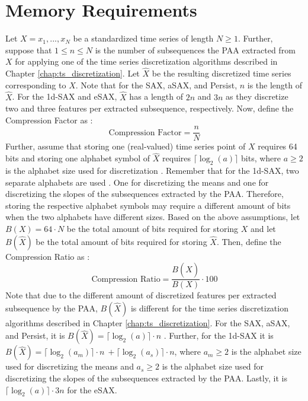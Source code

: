 \section{Memory Requirements}
Let $X = x_1, ..., x_N$ be a standardized time series of length $N \geq 1$. Further, suppose that $1 \leq n \leq N$ is the number of subsequences the \ac{PAA} extracted from $X$ for applying one of the time series discretization algorithms described in Chapter \ref{chap:ts_discretization}. Let $\hat{X}$ be the resulting discretized time series corresponding to $X$. Note that for the \ac{SAX}, \ac{aSAX}, and Persist, $n$ is the length of $\hat{X}$. For the \ac{1d-SAX} and \ac{eSAX}, $\hat{X}$ has a length of $2n$ and $3n$ as they discretize two and three features per extracted subsequence, respectively. Now, define the Compression Factor as \cite{Comparison_SAX}:
\begin{equation}
\text{Compression Factor} = \frac{n}{N}
\label{eq:compression_factor}
\end{equation}
Further, assume that storing one (real-valued) time series point of $X$ requires 64 bits and storing one alphabet symbol of $\hat{X}$ requires $\lceil \log_{2}(a) \rceil$ bits, where $a \geq 2$ is the alphabet size used for discretization \cite{Comparison_SAX}. \newline
Remember that for the \ac{1d-SAX}, two separate alphabets are used \cite{1d-SAX}. One for discretizing the means and one for discretizing the slopes of the subsequences extracted by the \ac{PAA}. Therefore, storing the respective alphabet symbols may require a different amount of bits when the two alphabets have different sizes. \newline
Based on the above assumptions, let $B(X) = 64 \cdot N$ be the total amount of bits required for storing $X$ and let $B(\hat{X})$ be the total amount of bits required for storing $\hat{X}$. Then, define the Compression Ratio as \cite{Comparison_SAX}:
\begin{equation}
\text{Compression Ratio} = \frac{B(\hat{X})}{B(X)} \cdot 100
\label{eq:compression_ratio}
\end{equation}
Note that due to the different amount of discretized features per extracted subsequence by the \ac{PAA}, $B(\hat{X})$ is different for the time series discretization algorithms described in Chapter \ref{chap:ts_discretization}. For the \ac{SAX}, \ac{aSAX}, and Persist, it is $B(\hat{X}) = \lceil \log_{2}(a) \rceil \cdot n$ \cite{Comparison_SAX}. Further, for the \ac{1d-SAX} it is $B(\hat{X}) = \lceil \log_{2}(a_m) \rceil \cdot n \ + \lceil \log_{2}(a_s) \rceil \cdot n$, where $a_m \geq 2$ is the alphabet size used for discretizing the means and $a_s \geq 2$ is the alphabet size used for discretizing the slopes of the subsequences extracted by the \ac{PAA}. Lastly, it is $\lceil \log_{2}(a) \rceil \cdot 3n$ for the \ac{eSAX}.

